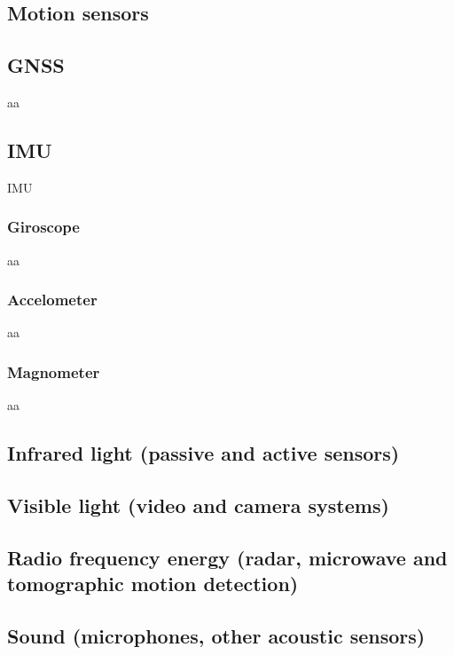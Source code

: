 \documentclass[a4paper]{article}
\title{}
\date{}
\begin{document}
    \maketitle
    
    \subsection{Motion sensors}
    
    \subsection{GNSS}
        aa
    
    \subsection{IMU}
        IMU
        
        \subsubsection{Giroscope}
            aa
        
        \subsubsection{Accelometer}
            aa
        
        \subsubsection{Magnometer}
            aa
    
    \subsection{Infrared light (passive and active sensors)}
    
    \subsection{Visible light (video and camera systems)}
    
    \subsection{Radio frequency energy (radar, microwave and tomographic motion detection)}
    
    \subsection{Sound (microphones, other acoustic sensors)}
    
\end{document}
